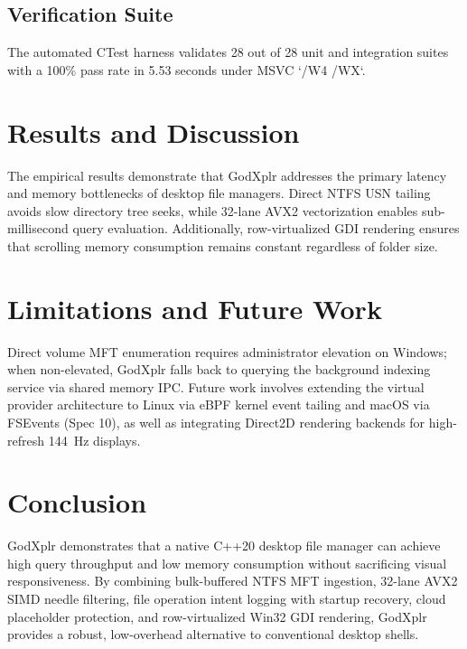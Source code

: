 \documentclass[conference]{IEEEtran}
\begin{document}
\subsection{Verification Suite}
The automated CTest harness validates 28 out of 28 unit and integration suites with a 100\% pass rate in 5.53 seconds under MSVC `/W4 /WX`.

\section{Results and Discussion}
The empirical results demonstrate that GodXplr addresses the primary latency and memory bottlenecks of desktop file managers. Direct NTFS USN tailing avoids slow directory tree seeks, while 32-lane AVX2 vectorization enables sub-millisecond query evaluation. Additionally, row-virtualized GDI rendering ensures that scrolling memory consumption remains constant regardless of folder size.

\section{Limitations and Future Work}
Direct volume MFT enumeration requires administrator elevation on Windows; when non-elevated, GodXplr falls back to querying the background indexing service via shared memory IPC. Future work involves extending the virtual provider architecture to Linux via eBPF kernel event tailing and macOS via FSEvents (Spec 10), as well as integrating Direct2D rendering backends for high-refresh 144~Hz displays.

\section{Conclusion}
GodXplr demonstrates that a native C++20 desktop file manager can achieve high query throughput and low memory consumption without sacrificing visual responsiveness. By combining bulk-buffered NTFS MFT ingestion, 32-lane AVX2 SIMD needle filtering, file operation intent logging with startup recovery, cloud placeholder protection, and row-virtualized Win32 GDI rendering, GodXplr provides a robust, low-overhead alternative to conventional desktop shells.



\end{document}
